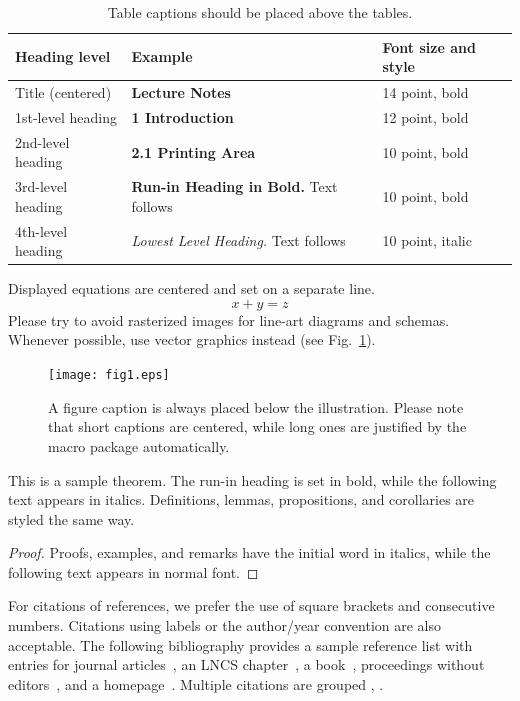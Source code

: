 \documentclass[runningheads]{llncs}
\begin{document}
{    \begin{table}
        \caption{Table captions should be placed above the
        tables.}\label{tab1}
        \begin{tabular}{|l|l|l|}
            \hline
            Heading level & Example & Font size and style\\
            \hline
            Title (centered)  & {\Large\bfseries Lecture Notes}                 & 14 point, bold   \\
            1st-level heading & {\large\bfseries 1 Introduction}                 & 12 point, bold   \\
            2nd-level heading & {\bfseries 2.1 Printing Area}                     & 10 point, bold   \\
            3rd-level heading & {\bfseries Run-in Heading in Bold.} Text follows & 10 point, bold   \\
            4th-level heading & {\itshape Lowest Level Heading.} Text follows & 10 point, italic \\
            \hline
        \end{tabular}
    \end{table}


    \noindent Displayed equations are centered and set on a separate
    line.
    \begin{equation}
        x + y = z
    \end{equation}
    Please try to avoid rasterized images for line-art diagrams and
    schemas. Whenever possible, use vector graphics instead (see
    Fig.~\ref{fig1}).

    \begin{figure}
        \texttt{[image: fig1.eps]}
        \caption{A figure caption is always placed below the illustration.
        Please note that short captions are centered, while long ones are
        justified by the macro package automatically.} \label{fig1}
    \end{figure}

    \begin{theorem}
        This is a sample theorem. The run-in heading is set in bold, while
        the following text appears in italics. Definitions, lemmas,
        propositions, and corollaries are styled the same way.
    \end{theorem}
    \begin{proof}
        Proofs, examples, and remarks have the initial word in italics,
        while the following text appears in normal font.
    \end{proof}
    For citations of references, we prefer the use of square brackets
    and consecutive numbers. Citations using labels or the author/year
    convention are also acceptable. The following bibliography provides
    a sample reference list with entries for journal
    articles~\cite{ref_article1}, an LNCS chapter~\cite{ref_lncs1}, a
    book~\cite{ref_book1}, proceedings without editors~\cite{ref_proc1},
    and a homepage~\cite{ref_url1}. Multiple citations are grouped
    \cite{ref_article1,ref_lncs1,ref_book1},
    \cite{ref_article1,ref_book1,ref_proc1,ref_url1}.
    }
    
    
\end{document}
